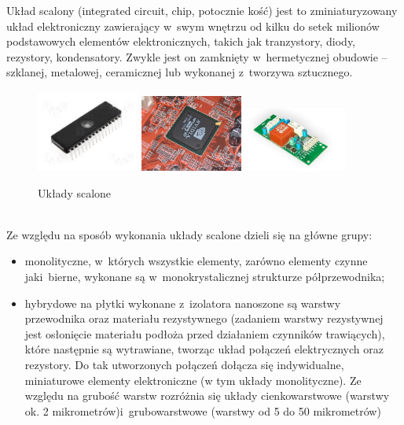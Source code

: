 \documentclass[a4paper,11pt]{article}
\begin{document}
Układ scalony (integrated circuit, chip, potocznie kość) jest to zminiaturyzowany układ elektroniczny zawierający w~swym wnętrzu od kilku do setek milionów podstawowych elementów elektronicznych, takich jak tranzystory, diody, rezystory, kondensatory. Zwykle jest on zamknięty w~hermetycznej obudowie -- szklanej, metalowej, ceramicznej lub wykonanej z~tworzywa sztucznego.\\
\begin{figure}[!htb]
\centering
\includegraphics[width=0.3\textwidth]{uklad1.jpg}
\quad
\includegraphics[width=0.3\textwidth]{uklad2.jpg}
\quad
\includegraphics[width=0.3\textwidth]{uklad3.jpg}
\caption{Układy scalone}
\label{fig:ukladyScalone}
\end{figure}\\
Ze względu na sposób wykonania układy scalone dzieli się na główne grupy:
\begin{itemize}
\item monolityczne, w~których wszystkie elementy, zarówno elementy czynne jaki~bierne, wykonane są w~monokrystalicznej strukturze półprzewodnika;
\item hybrydowe na płytki wykonane z~izolatora nanoszone są warstwy przewodnika oraz materiału rezystywnego (zadaniem warstwy rezystywnej jest osłonięcie materiału podłoża przed działaniem czynników trawiących), które następnie są wytrawiane, tworząc układ połączeń elektrycznych oraz rezystory. Do tak utworzonych połączeń dołącza się indywidualne, miniaturowe elementy elektroniczne (w tym układy monolityczne). Ze względu na grubość warstw rozróżnia się układy cienkowarstwowe (warstwy ok. 2 mikrometrów)i~grubowarstwowe (warstwy od 5 do 50 mikrometrów)
\end{itemize}
\end{document}
